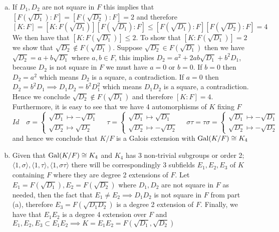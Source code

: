 \begin{solution}
    \begin{enumerate}[(a)]
        \item If $D_1, D_2$ are not square in $F$ this implies that $[F(\sqrt{D_1}):F]=[F(\sqrt{D_2}):F]=2$ and therefore \[[K:F] = [K:F(\sqrt{D_1})][F(\sqrt{D_1}):F] \leq [F(\sqrt{D_1}):F][F(\sqrt{D_2}):F] = 4\]
        We then have that $[K:F(\sqrt{D_1})] \leq 2$. To show that $[K:F(\sqrt{D_1})] = 2$ we show that $\sqrt{D_2} \not\in F(\sqrt{D_1})$. Suppose $\sqrt{D_2} \in F(\sqrt{D_1})$ then we have $\sqrt{D_2} = a + b\sqrt{D_1}$ where $a, b \in F$, this implies $D_2 = a^2 + 2ab\sqrt{D_1} + b^2D_1$, because $D_2$ is not square in $F$ we must have $a = 0$ or $b = 0$. If $b = 0$ then $D_2 = a^2$ which means $D_2$ is a square, a contradiction. If $a = 0$ then $D_2 = b^2D_1 \implies D_1D_2 = b^2D_1^2$ which means $D_1D_2$ is a square, a contradiction. Hence we conclude $\sqrt{D_2} \not\in F(\sqrt{D_1})$ and therefore $[K:F] = 4$. Furthermore, it is easy to see that we have 4 automorphisms of $K$ fixing $F$
        \[Id \quad \sigma = \begin{cases}
            \sqrt{D_1} \mapsto -\sqrt{D_1} \\
            \sqrt{D_2} \mapsto \sqrt{D_2}
        \end{cases} \quad \tau = \begin{cases}
            \sqrt{D_1} \mapsto \sqrt{D_1} \\
            \sqrt{D_2} \mapsto -\sqrt{D_2}
        \end{cases} \quad \sigma\tau = \tau\sigma = \begin{cases}
            \sqrt{D_1} \mapsto -\sqrt{D_1} \\
            \sqrt{D_2} \mapsto -\sqrt{D_2}
        \end{cases}\] and hence we conclude that $K/F$ is a Galois extension with $\operatorname{Gal}(K/F) \cong K_4$

        \item Given that $\operatorname{Gal}(K/F) \cong K_4$ and $K_4$ has 3 non-trivial subgroups or order 2; $\langle 1, \sigma \rangle, \langle 1, \tau \rangle, \langle 1, \sigma\tau \rangle$ there will be correspondingly 3 subfields $E_1, E_2, E_3$ of $K$ containing $F$ where they are degree 2 extensions of $F$. Let $E_1 = F(\sqrt{D_1}), E_2 = F(\sqrt{D_2})$ where $D_1, D_2$ are not square in $F$ as needed, then the fact that $E_1 \neq E_2 \implies D_1D_2$ is not square in $F$ from part (a), therefore $E_3 = F(\sqrt{D_1D_2})$ is a degree 2 extension of $F$. Finally, we have that $E_1E_2$ is a degree 4 extension over $F$ and $E_1, E_2, E_3 \subset E_1E_2 \implies K = E_1E_2 = F(\sqrt{D_1}, \sqrt{D_2})$ 
    \end{enumerate}
\end{solution}


